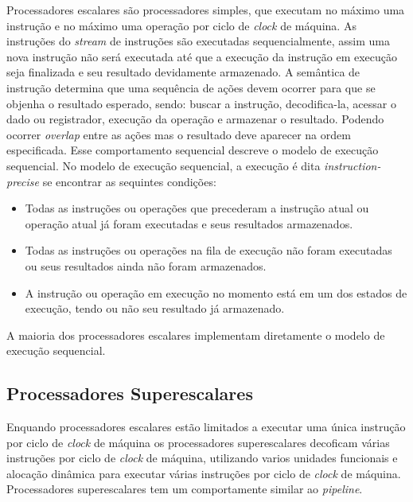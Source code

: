 Processadores escalares são processadores simples, que executam no 
máximo uma instrução e no máximo uma operação por ciclo de \textit{clock} de 
máquina. 
As instruções do \textit{stream} de instruções são executadas 
sequencialmente, assim uma nova instrução não será executada até que a execução 
da instrução em execução seja finalizada e seu resultado devidamente
armazenado.
A semântica de instrução determina que uma sequência de ações devem ocorrer
para que se objenha o resultado esperado, sendo: buscar a instrução,
decodifica-la, acessar o dado ou registrador, execução da operação e armazenar o
resultado. 
Podendo ocorrer \textit{overlap} entre as ações mas o resultado deve
aparecer na ordem especificada.
Esse comportamento sequencial descreve o modelo de execução sequencial.
No modelo de execução sequencial, a execução é dita \textit{instruction-precise}
se encontrar as sequintes condições:

\begin{itemize}
        \item Todas as instruções ou operações que precederam a instrução atual
                ou operação atual já foram executadas e seus resultados
                armazenados.
        \item Todas as instruções ou operações na fila de execução não foram
                executadas ou seus resultados ainda não foram armazenados.
        \item A instrução ou operação em execução no momento está em um dos
                estados de execução, tendo ou não seu resultado já armazenado.
\end{itemize}

A maioria dos processadores escalares implementam diretamente o modelo de
execução sequencial.


\subsection{Processadores Superescalares}

Enquando processadores escalares estão limitados a executar uma única instrução 
por ciclo de \textit{clock} de máquina os processadores superescalares decoficam
várias instruções por ciclo de \textit{clock} de máquina, utilizando varios
unidades funcionais e alocação dinâmica para executar várias instruções por
ciclo de \textit{clock} de máquina. 
Processadores superescalares tem um comportamente similar ao \textit{pipeline}.

